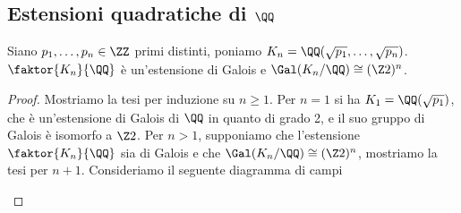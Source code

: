 \documentclass[11pt]{scrartcl}
\begin{document}
	\newpage
	
	\subsection{Estensioni quadratiche di $\QQ$}
	
	\begin{theorem}
		Siano $p_1, \ldots, p_n \in \ZZ$ primi distinti, poniamo $K_n = 
		\QQ(\sqrt{p_1}, \ldots, \sqrt{p_n})$. $\faktor{K_n}{\QQ}$ è un'estensione
		di Galois e $\Gal(K_n/\QQ) \cong (\Z2)^n$.
	\end{theorem}
	
	\begin{proof}
		Mostriamo la tesi per induzione su $n \geq 1$. Per $n = 1$ si ha $K_1 = \QQ(\sqrt{p_1})$,
		che è un'estensione di Galois di $\QQ$ in quanto di grado 2, e il suo 
		gruppo di Galois è isomorfo a $\Z2$. Per $n > 1$, supponiamo che l'estensione
		$\faktor{K_n}{\QQ}$ sia di Galois e che $\Gal(K_n/\QQ) \cong (\Z2)^n$, 
		mostriamo la tesi per $n + 1$. Consideriamo il seguente diagramma di campi
		\begin{center}
\end{center}
\end{proof}
\end{document}
